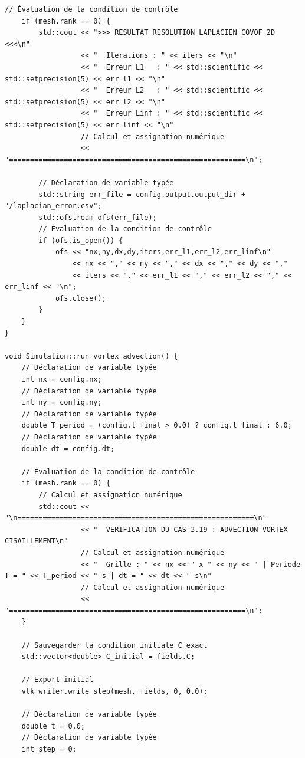 \documentclass[10pt,a4paper,oneside]{book}
\begin{document}
\begin{lstlisting}[language={[11]C++}]
    // Évaluation de la condition de contrôle
    if (mesh.rank == 0) {
        std::cout << ">>> RESULTAT RESOLUTION LAPLACIEN COVOF 2D <<<\n"
                  << "  Iterations : " << iters << "\n"
                  << "  Erreur L1   : " << std::scientific << std::setprecision(5) << err_l1 << "\n"
                  << "  Erreur L2   : " << std::scientific << std::setprecision(5) << err_l2 << "\n"
                  << "  Erreur Linf : " << std::scientific << std::setprecision(5) << err_linf << "\n"
                  // Calcul et assignation numérique
                  << "========================================================\n";

        // Déclaration de variable typée
        std::string err_file = config.output.output_dir + "/laplacian_error.csv";
        std::ofstream ofs(err_file);
        // Évaluation de la condition de contrôle
        if (ofs.is_open()) {
            ofs << "nx,ny,dx,dy,iters,err_l1,err_l2,err_linf\n"
                << nx << "," << ny << "," << dx << "," << dy << ","
                << iters << "," << err_l1 << "," << err_l2 << "," << err_linf << "\n";
            ofs.close();
        }
    }
}

void Simulation::run_vortex_advection() {
    // Déclaration de variable typée
    int nx = config.nx;
    // Déclaration de variable typée
    int ny = config.ny;
    // Déclaration de variable typée
    double T_period = (config.t_final > 0.0) ? config.t_final : 6.0;
    // Déclaration de variable typée
    double dt = config.dt;

    // Évaluation de la condition de contrôle
    if (mesh.rank == 0) {
        // Calcul et assignation numérique
        std::cout << "\n========================================================\n"
                  << "  VERIFICATION DU CAS 3.19 : ADVECTION VORTEX CISAILLEMENT\n"
                  // Calcul et assignation numérique
                  << "  Grille : " << nx << " x " << ny << " | Periode T = " << T_period << " s | dt = " << dt << " s\n"
                  // Calcul et assignation numérique
                  << "========================================================\n";
    }

    // Sauvegarder la condition initiale C_exact
    std::vector<double> C_initial = fields.C;

    // Export initial
    vtk_writer.write_step(mesh, fields, 0, 0.0);

    // Déclaration de variable typée
    double t = 0.0;
    // Déclaration de variable typée
    int step = 0;


\end{lstlisting}
\end{document}
